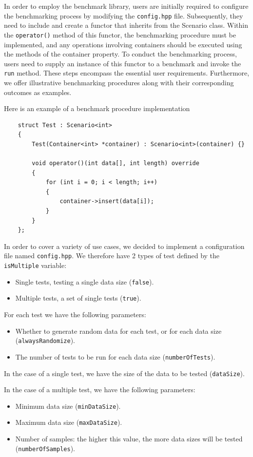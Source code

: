 \documentclass[conference]{IEEEtran} \IEEEoverridecommandlockouts
\def\code#1{\texttt{#1}}
\begin{document}
In order to employ the benchmark library, users are initially required
to configure the benchmarking process by modifying the \code{config.hpp}
file. Subsequently, they need to include and create a functor that
inherits from the Scenario class. Within the \code{operator()} method of
this functor, the benchmarking procedure must be implemented, and any
operations involving containers should be executed using the methods
of the container property. To conduct the benchmarking process, users
need to supply an instance of this functor to a benchmark and invoke
the \code{run} method. These steps encompass the essential user
requirements. Furthermore, we offer illustrative benchmarking
procedures along with their corresponding outcomes as examples.

Here is an example of a benchmark procedure implementation
\begin{lstlisting}
	struct Test : Scenario<int>
	{
		Test(Container<int> *container) : Scenario<int>(container) {}
		
		void operator()(int data[], int length) override
		{
			for (int i = 0; i < length; i++)
			{
				container->insert(data[i]);
			}
		}
	};
\end{lstlisting}

In order to cover a variety of use cases, we decided to
implement a configuration file named \code{config.hpp}. We therefore
have 2 types of test defined by the \code{isMultiple} variable:
\begin{itemize}
	\item Single tests, testing a single data size (\code{false}).
	\item Multiple tests, a set of single tests (\code{true}).
\end{itemize}

For each test we have the following parameters:
\begin{itemize}
	\item Whether to generate random data for each test, or for
          each data size (\code{alwaysRandomize}).
	\item The number of tests to be run for each data size
          (\code{numberOfTests}).
\end{itemize}

In the case of a single test, we have the size of the data to be
tested (\code{dataSize}).

In the case of a multiple test, we have the following parameters:
\begin{itemize}
	\item Minimum data size (\code{minDataSize}).
	\item Maximum data size (\code{maxDataSize}).
	\item Number of samples: the higher this value, the more data
          sizes will be tested (\code{numberOfSamples}).
\end{itemize}
\end{document}
